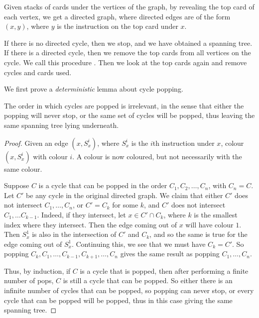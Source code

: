 \documentclass[a4paper]{article}
\begin{document}
Given stacks of cards under the vertices of the graph, by revealing the top card of each vertex, we get a directed graph, where directed edges are of the form $(x, y)$, where $y$ is the instruction on the top card under $x$.

If there is no directed cycle, then we stop, and we have obtained a spanning tree. If there is a directed cycle, then we remove the top cards from all vertices on the cycle. We call this procedure . Then we look at the top cards again and remove cycles and cards used.

We first prove a \emph{deterministic} lemma about cycle popping.
\begin{lemma}
  The order in which cycles are popped is irrelevant, in the sense that either the popping will never stop, or the same set of cycles will be popped, thus leaving the same spanning tree lying underneath.
\end{lemma}

\begin{proof}
  Given an edge $(x, S_x^i)$, where $S_x^i$ is the $i$th instruction under $x$, colour $(x, S_x^i)$ with colour $i$. A colour is now coloured, but not necessarily with the same colour.

  Suppose $C$ is a cycle that can be popped in the order $C_1, C_2, \ldots, C_n$, with $C_n = C$. Let $C'$ be any cycle in the original directed graph. We claim that either $C'$ does not intersect $C_1, \ldots, C_n$, or $C' = C_k$ for some $k$, and $C'$ does not intersect $C_1, \ldots C_{k - 1}$. Indeed, if they intersect, let $x \in C' \cap C_k$, where $k$ is the smallest index where they intersect. Then the edge coming out of $x$ will have colour $1$. Then $S_x^1$ is also in the intersection of $C'$ and $C_k$, and so the same is true for the edge coming out of $S_x^1$. Continuing this, we see that we must have $C_k = C'$. So popping $C_k, C_1, \ldots, C_{k - 1}, C_{k + 1}, \ldots, C_n$ gives the same result as popping $C_1, \ldots, C_n$.

  Thus, by induction, if $C$ is a cycle that is popped, then after performing a finite number of pops, $C$ is still a cycle that can be popped. So either there is an infinite number of cycles that can be popped, so popping can never stop, or every cycle that can be popped will be popped, thus in this case giving the same spanning tree.
\end{proof}
\printindex
\end{document}
